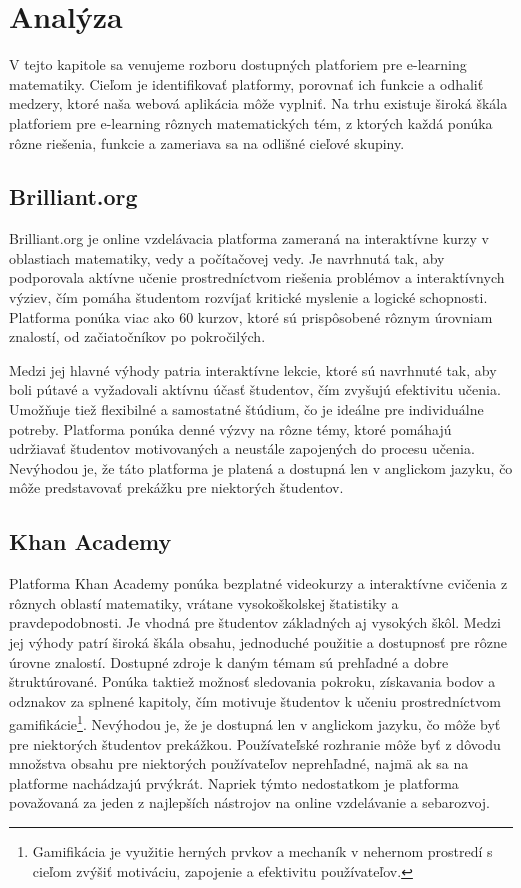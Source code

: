 \section{Analýza}
V tejto kapitole sa venujeme rozboru dostupných platforiem pre e-learning matematiky. 
Cieľom je identifikovať platformy, porovnať ich funkcie a odhaliť medzery, ktoré naša webová aplikácia môže vyplniť. 
Na trhu existuje široká škála platforiem pre e-learning rôznych matematických tém, 
z ktorých každá ponúka rôzne riešenia, funkcie a zameriava sa na odlišné cieľové skupiny.

\subsection{Brilliant.org}
Brilliant.org je online vzdelávacia platforma zameraná na interaktívne kurzy v oblastiach matematiky, vedy a počítačovej vedy.
Je navrhnutá tak, aby podporovala aktívne učenie prostredníctvom riešenia problémov a interaktívnych výziev, čím pomáha študentom rozvíjať kritické myslenie a logické schopnosti.
Platforma ponúka viac ako 60 kurzov, ktoré sú prispôsobené rôznym úrovniam znalostí, od začiatočníkov po pokročilých.

Medzi jej hlavné výhody patria interaktívne lekcie, ktoré sú navrhnuté tak, aby boli pútavé a vyžadovali aktívnu účasť študentov, čím zvyšujú efektivitu učenia.
Umožňuje tiež flexibilné a samostatné štúdium, čo je ideálne pre individuálne potreby. 
Platforma ponúka denné výzvy na rôzne témy, ktoré pomáhajú udržiavať študentov motivovaných a neustále zapojených do procesu učenia.
Nevýhodou je, že táto platforma je platená a dostupná len v anglickom jazyku, čo môže predstavovať prekážku pre niektorých študentov.
\cite{brilliant}
\subsection{Khan Academy}
Platforma Khan Academy ponúka bezplatné videokurzy a interaktívne cvičenia z rôznych oblastí matematiky, vrátane vysokoškolskej štatistiky a pravdepodobnosti.
Je vhodná pre študentov základných aj vysokých škôl. 
Medzi jej výhody patrí široká škála obsahu, jednoduché použitie a dostupnosť pre rôzne úrovne znalostí.
Dostupné zdroje k daným témam sú prehľadné a dobre štruktúrované.
Ponúka taktiež možnosť sledovania pokroku, získavania bodov a odznakov za splnené kapitoly, čím motivuje študentov k učeniu prostredníctvom gamifikácie\footnote{Gamifikácia je využitie herných prvkov a mechaník v nehernom prostredí s cieľom zvýšiť motiváciu, zapojenie a efektivitu používateľov.}.
Nevýhodou je, že je dostupná len v anglickom jazyku, čo môže byť pre niektorých študentov prekážkou. 
Používateľské rozhranie môže byť z dôvodu množstva obsahu pre niektorých používateľov neprehľadné, najmä ak sa na platforme nachádzajú prvýkrát. 
Napriek týmto nedostatkom je platforma považovaná za jeden z najlepších nástrojov na online vzdelávanie a sebarozvoj. \cite{khanacademy}
